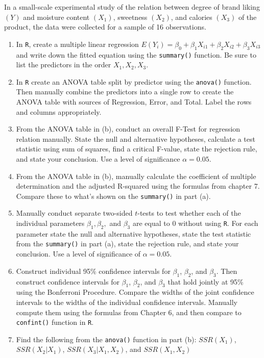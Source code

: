 \documentclass[12pt]{article}
\newenvironment{problem}[2][Problem]{\begin{trivlist}
\item[\hskip \labelsep {\bfseries #1}\hskip \labelsep {\bfseries #2.}]}{\end{trivlist}}
\begin{document}
\begin{problem}{1}
In a small-scale experimental study of the relation between degree of brand liking \((Y)\) and moisture content \((X_1)\), sweetness \((X_2)\), and calories \((X_3)\) of the product, the data were collected for a sample of 16 observations. 
\begin{enumerate}[label=(\alph*)]
\item
In \verb|R|, create a multiple linear regression \(E(Y_i) = \beta_0 + \beta_1X_{i1} +\beta_2X_{i2}+\beta_3X_{i3}\) and write down the fitted equation using the \verb|summary()| function. Be sure to list the predictors in the order \(X_1,X_2,X_3\).
\item
In \verb|R| create an ANOVA table split by predictor using the \verb|anova()| function. Then manually combine the predictors into a single row to create the ANOVA table with sources of Regression, Error, and Total. Label the rows and columns appropriately.
\item
From the ANOVA table in (b), conduct an overall F-Test for regression relation manually. State the null and alternative hypotheses, calculate a test statistic using sum of squares, find a critical F-value, state the rejection rule, and state your conclusion. Use a level of significance \(\alpha = 0.05\). 
\item
From the ANOVA table in (b), manually calculate the coefficient of multiple determination and the adjusted R-squared using the formulas from chapter 7. Compare these to what's shown on the \verb|summary()| in part (a).
\item
Manually conduct separate two-sided \(t\)-tests to test whether each of the individual parameters \(\beta_1,\beta_2,\) and \(\beta_3\) are equal to 0 without using \verb|R|. For each parameter state the null and alternative hypotheses, state the test statistic from the \verb|summary()| in part (a), state the rejection rule, and state your conclusion. Use a level of significance of \(\alpha=0.05\).
\item 
Construct individual 95\% confidence intervals for \(\beta_1\), \(\beta_2\), and \(\beta_3\). Then construct confidence intervals for \(\beta_1\), \(\beta_2\), and \(\beta_3\) that hold jointly at 95\% using the Bonferroni Procedure. Compare the widths of the joint confidence intervals to the widths of the individual confidence intervals. Manually compute them using the formulas from Chapter 6, and then compare to \verb|confint()| function in \verb|R|.
\item 
Find the following from the \verb|anova()| function in part (b): \(SSR(X_1)\), \(SSR(X_2|X_1)\), \(SSR(X_3|X_1,X_2)\), and \(SSR(X_1,X_2)\) 

\end{enumerate}
\end{problem}
\end{document}
